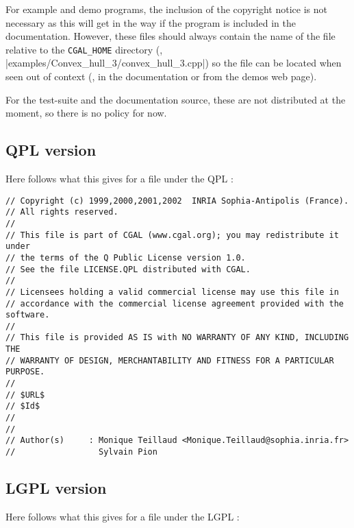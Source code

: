 For example and demo programs, the inclusion of the copyright notice is not
necessary as this will get in the way if the program is included in the
documentation.  However, these files should always contain the name of
the file relative to the \texttt{CGAL\_HOME} directory
(\eg, \nonlinkedpath|examples/Convex_hull_3/convex_hull_3.cpp|)
so the file can be located when seen out of context (\eg, in the documentation
or from the demos web page).

For the test-suite and the documentation source, these are not distributed at
the moment, so there is no policy for now.

\subsection*{QPL version}

Here follows what this gives for a file under the QPL :

\begin{verbatim}
// Copyright (c) 1999,2000,2001,2002  INRIA Sophia-Antipolis (France).
// All rights reserved.
//
// This file is part of CGAL (www.cgal.org); you may redistribute it under
// the terms of the Q Public License version 1.0.
// See the file LICENSE.QPL distributed with CGAL.
//
// Licensees holding a valid commercial license may use this file in
// accordance with the commercial license agreement provided with the software.
//
// This file is provided AS IS with NO WARRANTY OF ANY KIND, INCLUDING THE
// WARRANTY OF DESIGN, MERCHANTABILITY AND FITNESS FOR A PARTICULAR PURPOSE.
//
// $URL$
// $Id$
// 
//
// Author(s)     : Monique Teillaud <Monique.Teillaud@sophia.inria.fr>
//                 Sylvain Pion
\end{verbatim}

\subsection*{LGPL version}

Here follows what this gives for a file under the LGPL :

